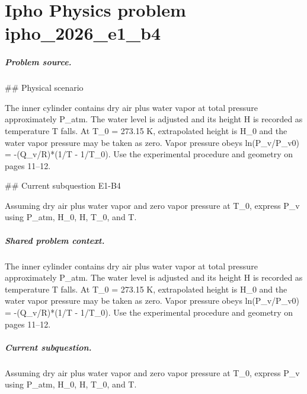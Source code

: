 
\chapter{Ipho Physics problem ipho\_2026\_e1\_b4}
\label{ch:IPhO2026Problems_problem_ipho_2026_e1_b4}

\paragraph{Problem source.}
\#\# Physical scenario

The inner cylinder contains dry air plus water vapor at total pressure
approximately P\_atm.  The water level is adjusted and its height H is recorded
as temperature T falls.  At T\_0 = 273.15 K, extrapolated height is H\_0 and the
water vapor pressure may be taken as zero.  Vapor pressure obeys
ln(P\_v/P\_v0) = -(Q\_v/R)*(1/T - 1/T\_0).  Use the experimental procedure and
geometry on pages 11--12.

\#\# Current subquestion E1-B4

Assuming dry air plus water vapor and zero vapor pressure at T\_0, express P\_v using P\_atm, H\_0, H, T\_0, and T.

\paragraph{Shared problem context.}
The inner cylinder contains dry air plus water vapor at total pressure
approximately P\_atm.  The water level is adjusted and its height H is recorded
as temperature T falls.  At T\_0 = 273.15 K, extrapolated height is H\_0 and the
water vapor pressure may be taken as zero.  Vapor pressure obeys
ln(P\_v/P\_v0) = -(Q\_v/R)*(1/T - 1/T\_0).  Use the experimental procedure and
geometry on pages 11--12.

\paragraph{Current subquestion.}
Assuming dry air plus water vapor and zero vapor pressure at T\_0, express P\_v using P\_atm, H\_0, H, T\_0, and T.

